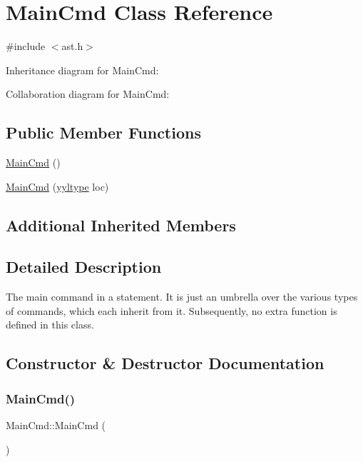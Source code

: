 \hypertarget{class_main_cmd}{}\section{Main\+Cmd Class Reference}
\label{class_main_cmd}


{\ttfamily \#include $<$ast.\+h$>$}



Inheritance diagram for Main\+Cmd\+:


Collaboration diagram for Main\+Cmd\+:
\subsection*{Public Member Functions}
\begin{DoxyCompactItemize}
\item 
\hyperlink{class_main_cmd_ae4e53e786c87bf0e722acf4755f27def}{Main\+Cmd} ()
\item 
\hyperlink{class_main_cmd_a36da38d394389df52d99475914d62171}{Main\+Cmd} (\hyperlink{structyyltype}{yyltype} loc)
\end{DoxyCompactItemize}
\subsection*{Additional Inherited Members}


\subsection{Detailed Description}
The main command in a statement. It is just an umbrella over the various types of commands, which each inherit from it. Subsequently, no extra function is defined in this class. 

\subsection{Constructor \& Destructor Documentation}
\mbox{\label{class_main_cmd_ae4e53e786c87bf0e722acf4755f27def}} 
\subsubsection{\texorpdfstring{Main\+Cmd()}{MainCmd()}\hspace{0.1cm}{\footnotesize\ttfamily [1/2]}}
{\footnotesize\ttfamily Main\+Cmd\+::\+Main\+Cmd (\begin{DoxyParamCaption}{ }\end{DoxyParamCaption})\hspace{0.3cm}{\ttfamily [inline]}}

